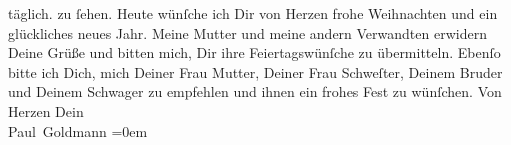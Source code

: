 \begin{ledgroupsized}[t]{13cm}
{{{                  täglich.}}}\label{K_L02900-14h} zu ſehen.\pend
           \pstart
           Heute wünſche ich Dir von Herzen frohe Weihnachten und
               ein glückliches neues Jahr.\pend
           \pstart
           Meine Mutter und meine
               andern Verwandten erwidern Deine Grüße und bitten mich, Dir ihre Feiertagswünſche zu
               übermitteln.\pend
           \pstart
           Ebenſo bitte ich Dich, mich Deiner Frau Mutter, Deiner Frau Schweſter, Deinem Bruder und Deinem Schwager zu empfehlen und ihnen ein frohes Fest zu
               wünſchen.\pend
           \pstart
           Von Herzen Dein {\\[\baselineskip]}\spacefill\mbox{Paul Goldmann}\pend
           \leftskip=0em{}
         
         \endnumbering{}\end{ledgroupsized}  \newcommand{\dateiname}{L02900}\newcommand{\titel}{Paul Goldmann an Arthur Schnitzler, 23. 12. [1899]}\newcommand{\editorInnen}{Martin Anton Müller und Laura Untner}
      